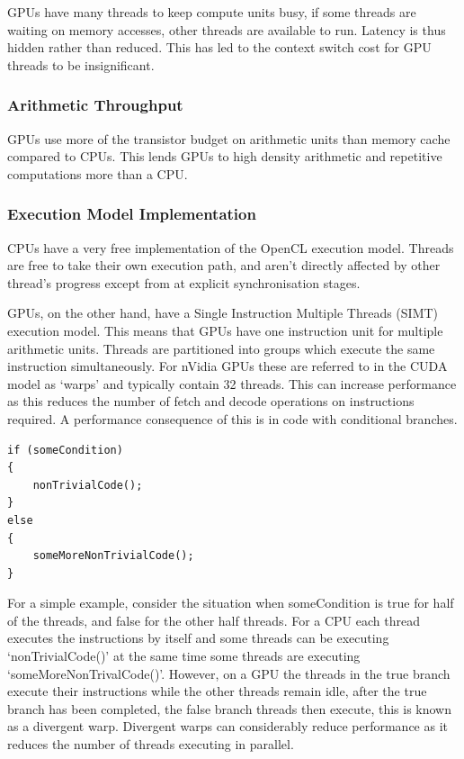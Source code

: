 GPUs have many threads to keep compute units busy, if some threads are waiting
on memory accesses, other threads are available to run. Latency is thus hidden
rather than reduced. This has led to the context switch cost for GPU threads to
be insignificant.

\subsubsection{Arithmetic Throughput}

GPUs use more of the transistor budget on arithmetic units than memory cache
compared to CPUs. This lends GPUs to high density arithmetic and repetitive
computations more than a CPU.

\subsubsection{Execution Model Implementation}

CPUs have a very free implementation of the OpenCL execution model. Threads are
free to take their own execution path, and aren't directly affected by other
thread's progress except from at explicit synchronisation stages.

GPUs, on the other hand, have a Single Instruction Multiple Threads (SIMT)
execution model. This means that GPUs have one instruction unit for multiple
arithmetic units. Threads are partitioned into groups which execute the same
instruction simultaneously. For nVidia GPUs these are referred to in the CUDA
model as `warps' and typically contain 32 threads. This can increase performance
as this reduces the number of fetch and decode operations on instructions
required. A performance consequence of this is in code with conditional
branches.

\begin{verbatim}
if (someCondition)
{
    nonTrivialCode();
}
else
{
    someMoreNonTrivialCode();
}
\end{verbatim}

For a simple example, consider the situation when someCondition is true for half
of the threads, and false for the other half threads. For a CPU each thread
executes the instructions by itself and some threads can be executing
`nonTrivialCode()' at the same time some threads are executing
`someMoreNonTrivalCode()'. However, on a GPU the threads in the true branch
execute their instructions while the other threads remain idle, after the true
branch has been completed, the false branch threads then execute, this is known
as a divergent warp. Divergent warps can considerably reduce performance as it
reduces the number of threads executing in parallel.

